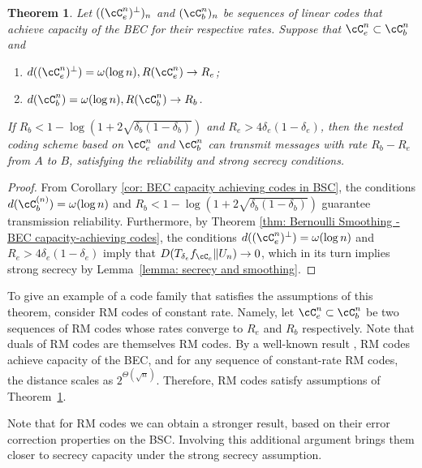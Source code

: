 \documentclass{amsart}
\newtheorem{theorem}{Theorem}[section]
\theoremstyle{remark}
\begin{document}
%
\begin{theorem}\label{thm: Wiretap channels achievable rates for BEC capacity-achieving codes}
Let $((\cC_e^{n})^{\bot})_n$ and $(\cC_b^{n})_n$ be sequences of linear codes that achieve capacity of the BEC for their respective rates.
Suppose that $\cC_e^{n}\subset\cC_b^{n}$ and 
\begin{enumerate}
    \item  $d((\cC_e^{n})^\bot) = \omega(\log n), R(\cC_e^{n})\rightarrow R_e$;\\[-.1in]
    \item $d(\cC_b^{n}) = 
\omega(\log n), R(\cC_b^{n})\rightarrow R_b$.
\end{enumerate}
If $R_b 
<1-\log(1+2\sqrt{\delta_b(1-\delta_b)})$ and $R_e > 4\delta_e(1-\delta_e)$, then the nested coding scheme based on 
$\cC_e^{n}$ and $\cC_b^{n}$ can transmit messages with rate $R_b-R_e$ from $A$ to $B$, 
satisfying the reliability and strong secrecy conditions.
\end{theorem}
\begin{proof}
From Corollary \ref{cor: BEC capacity achieving codes in BSC}, the conditions 
$d(\cC_b^{(n)}) = \omega(\log n)$ and $R_b <1-\log(1+2\sqrt{\delta_b(1-\delta_b)})$ 
guarantee transmission reliability. Furthermore, by Theorem \ref{thm: Bernoulli 
Smoothing - BEC capacity-achieving codes}, the conditions $d((\cC_e^{n})^\bot) = 
\omega(\log n)$ and $R_e > 4\delta_e(1-\delta_e)$ imply that $D(T_{\delta_e}f_{\cC_e}
\|U_n)  \rightarrow 0$, which in its turn implies strong secrecy by Lemma~\ref{lemma: 
secrecy and smoothing}.
\end{proof}

To give an example of a code family that satisfies the assumptions of this theorem, consider RM codes of constant
rate. Namely, let $\cC_e^{n} \subset \cC_b^{n}$ be two sequences of RM codes whose rates converge to $R_e$ and $R_b$ respectively. Note that duals of RM codes are themselves RM codes. By a well-known result \cite{kudekar2016reed}, RM codes achieve capacity of the BEC, and for any sequence of constant-rate RM codes, the distance scales as $2^{\Theta(\sqrt{n})}$. Therefore, RM codes
satisfy assumptions of Theorem~\ref{thm: Wiretap channels achievable rates for BEC capacity-achieving codes}.

Note that for RM codes we can obtain a stronger result, based on their error correction properties on the BSC. Involving this
additional argument brings them closer to secrecy capacity under the strong secrecy assumption.
\end{document}
